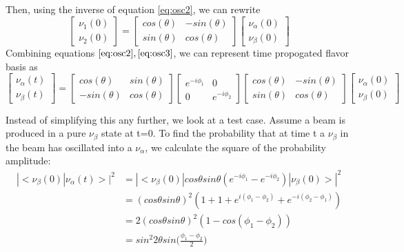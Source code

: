 \documentclass[12pt]{article}
\begin{document}
Then, using the inverse of equation \ref{eq:osc2}, we can rewrite 
\begin{equation} \label{eq:osc3}
 \begin{bmatrix}
 \nu_1(0)
 \\ \nu_2(0)
 \end{bmatrix}
 = \begin{bmatrix}
cos(\theta) & -sin(\theta)
\\ sin(\theta)& cos(\theta)
\end{bmatrix} 
 \begin{bmatrix}
 \nu_\alpha(0)
 \\ \nu_\beta(0)
 \end{bmatrix}
\end{equation}
Combining equations $\ref{eq:osc2}, \ref{eq:osc3}$, we can represent time propogated flavor basis as
\begin{equation} \label{eq:osc4}
 \begin{bmatrix}
 \nu_\alpha(t)
 \\ \nu_\beta(t)
 \end{bmatrix}
 = \begin{bmatrix}
cos(\theta) & sin(\theta)
\\ -sin(\theta)& cos(\theta)
\end{bmatrix} 
  \begin{bmatrix}
 e^{-i\phi_1} & 0
\\ 0 & e^{-i\phi_2}
  \end{bmatrix}
\begin{bmatrix}
cos(\theta) & -sin(\theta)
\\ sin(\theta)& cos(\theta)
\end{bmatrix}
\begin{bmatrix}
\nu_\alpha(0)
\\ \nu_\beta(0) 
\end{bmatrix}
\end{equation}

Instead of simplifying this any further, we look at a test case. Assume a beam is produced in a pure $\nu_\beta$ state at t=0. To find the probability that at time t a $\nu_\beta$ in the beam has oscillated into a $\nu_\alpha$, we calculate the square of the probability amplitude:
\begin{equation} \label{eq:osc5}
\begin{split}
 |<\nu_\beta(0)|\nu_\alpha(t)>|^2 &= |<\nu_\beta(0)|cos\theta sin\theta(e^{-i\phi_1}-e^{-i\phi_2})|\nu_\beta(0)>|^2
\\&= (cos\theta sin\theta)^2(1+1+e^{i(\phi_1-\phi_2)} + e^{-i(\phi_2-\phi_1)})
\\&= 2(cos\theta sin\theta)^2(1-cos(\phi_1-\phi_2))
\\&= sin^2 2\theta sin\big(\frac{\phi_1-\phi_2}{2}\big)
\end{split}
 \end{equation}
\end{document}
